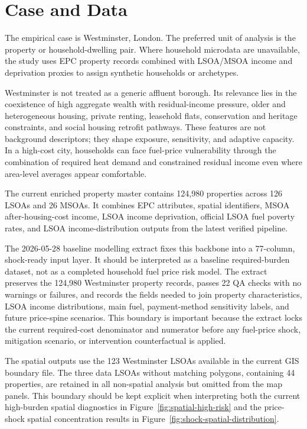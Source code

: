 \section{Case and Data}

The empirical case is Westminster, London. The preferred unit of analysis is the property or household-dwelling pair. Where household microdata are unavailable, the study uses EPC property records combined with LSOA/MSOA income and deprivation proxies to assign synthetic households or archetypes.

Westminster is not treated as a generic affluent borough. Its relevance lies in the coexistence of high aggregate wealth with residual-income pressure, older and heterogeneous housing, private renting, leasehold flats, conservation and heritage constraints, and social housing retrofit pathways. These features are not background descriptors; they shape exposure, sensitivity, and adaptive capacity. In a high-cost city, households can face fuel-price vulnerability through the combination of required heat demand and constrained residual income even where area-level averages appear comfortable.

The current enriched property master contains 124,980 properties across 126 LSOAs and 26 MSOAs. It combines EPC attributes, spatial identifiers, MSOA after-housing-cost income, LSOA income deprivation, official LSOA fuel poverty rates, and LSOA income-distribution outputs from the latest verified pipeline.

The 2026-05-28 baseline modelling extract fixes this backbone into a 77-column, shock-ready input layer. It should be interpreted as a baseline required-burden dataset, not as a completed household fuel price risk model. The extract preserves the 124,980 Westminster property records, passes 22 QA checks with no warnings or failures, and records the fields needed to join property characteristics, LSOA income distributions, main fuel, payment-method sensitivity labels, and future price-spine scenarios. This boundary is important because the extract locks the current required-cost denominator and numerator before any fuel-price shock, mitigation scenario, or intervention counterfactual is applied.

The spatial outputs use the 123 Westminster LSOAs available in the current GIS boundary file. The three data LSOAs without matching polygons, containing 44 properties, are retained in all non-spatial analysis but omitted from the map panels. This boundary should be kept explicit when interpreting both the current high-burden spatial diagnostics in Figure~\ref{fig:spatial-high-risk} and the price-shock spatial concentration results in Figure~\ref{fig:shock-spatial-distribution}.

